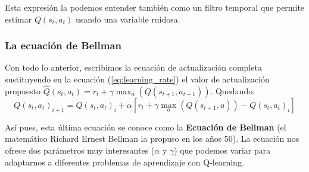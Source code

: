 \documentclass{article}
\begin{document}
Esta expresión la podemos entender también como un filtro temporal que permite estimar $Q(s_t,a_t)$ usando una variable ruidosa.

\subsubsection{La ecuación de Bellman}
Con todo lo anterior, escribimos la ecuación de actualización completa sustituyendo en la ecuación (\ref{eq:learning_rate}) el valor de actualización propuesto $\hat{Q}(s_t,a_t) = r_t + \gamma 
\max_a(Q(s_{t+1},a_{t+1}))$. Quedando:
\begin{equation}
Q(s_t,a_t)_{i+1} = Q(s_t,a_t)_{i} + \alpha [r_t + \gamma 
\max_a(Q(s_{t+1},a))- Q(s_t,a_t)_{i}]  
\end{equation}

Así pues, esta última ecuación se conoce como la \textbf{Ecuación de Bellman} (el matemático Richard Ernest Bellman la propuso en los años 50). La ecuación nos ofrece dos parámetros muy interesantes ($\alpha$ y $\gamma$) que podemos variar para adaptarnos a diferentes problemas de aprendizaje con Q-learning.
\end{document}
